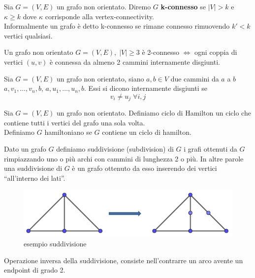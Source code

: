 \begin{definizione}
    Sia \(G=(V,E)\) un grafo non orientato. Diremo \(G\) \textbf{k-connesso} se \(|V|>k\) e \(\kappa \geq k\) dove \(\kappa\) corrisponde alla vertex-connectivity.\\
    Informalmente un grafo è detto k-connesso se rimane connesso rimuovendo \(k'<k\) vertici qualsiasi.
\end{definizione}

\begin{teorema}
    Un grafo non orientato \(G=(V,E),\; |V| \geq 3\) è 2-connesso \(\Leftrightarrow\) ogni coppia di vertici \((u,v)\) è connessa da almeno 2 cammini internamente disgiunti.
\end{teorema}

\begin{definizione}
    Sia \(G=(V,E)\) un grafo non orientato, siano \(a,b \in V\) due cammini da \(a\) a \(b\) \(a,v_1,\dots,v_n,b\), \(a,u_1,\dots,u_n,b\). Essi si dicono internamente disgiunti se
    \begin{equation}
        v_i \neq u_j\; \forall i,j
    \end{equation}
\end{definizione}

\begin{definizione}
    Sia \(G=(V,E)\) un grafo non orientato. Definiamo ciclo di Hamilton un ciclo che contiene tutti i vertici del grafo una sola volta.\\
    Definiamo \(G\) hamiltoniano se \(G\) contiene un ciclo di hamilton.
\end{definizione}

\begin{definizione}[Suddivisione]
    Dato un grafo \(G\) definiamo suddivisione (subdivision) di \(G\) i grafi ottenuti da \(G\) rimpiazzando uno o più archi con cammini di lunghezza 2 o più. In altre parole una suddivisione di \(G\) è un grafo ottenuto da esso inserendo dei vertici “all'interno dei lati”.
\end{definizione}
\begin{figure}[H]
    \centering
    \includegraphics[scale=0.6]{img/suddivisione.PNG}
    \caption{esempio suddivisione}
\end{figure}
\begin{definizione}[Contrazione]
    Operazione inversa della suddivisione, consiste nell'contrarre un arco avente un endpoint di grado 2.
\end{definizione}

